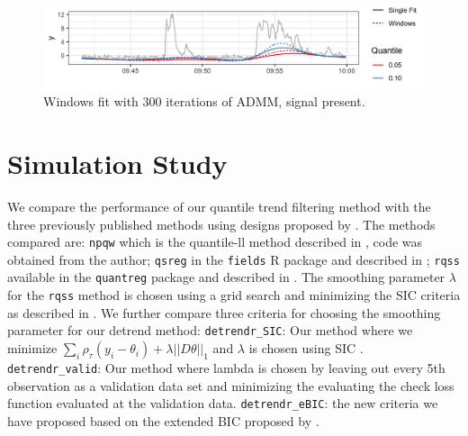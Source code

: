 \documentclass[12pt]{article}
\begin{document}
	\begin{figure}[!h] 
		\caption{Windows fit with 300 iterations of ADMM, signal present.}
		\includegraphics[width = \linewidth]{Figures/admm_windows2.png}
	\end{figure}

	\section{Simulation Study}
	
	We compare the performance of our quantile trend filtering method with the three previously published methods using designs proposed by \cite{Racine2017}. The methods compared are: \texttt{npqw} which is the quantile-ll method described in \cite{Racine2017}, code was obtained from the author; \texttt{qsreg} in the \texttt{fields} R package and described in \cite{Oh2011}; \texttt{rqss} available in the \texttt{quantreg} package and described in \cite{KoenkerNgPortnoy1994}.  The smoothing parameter $\lambda$ for the \texttt{rqss} method is chosen using a grid search and minimizing the SIC criteria as described in \cite{KoenkerNgPortnoy1994}. We further compare three criteria for choosing the smoothing parameter for our detrend method: \texttt{detrendr\_SIC}: Our method where we minimize $\sum_i\rho_{\tau}(y_i - \theta_i) + \lambda||D\theta||_1$ and $\lambda$ is chosen using SIC \citep{KoenkerNgPortnoy1994}.  \texttt{detrendr\_valid}: Our method where lambda is chosen by leaving out every 5th observation as a validation data set and minimizing the evaluating the check loss function evaluated at the validation data. \texttt{detrendr\_eBIC}:  the new criteria we have proposed based on the extended BIC proposed by \cite{chen2008}. 
	 
\end{document}
